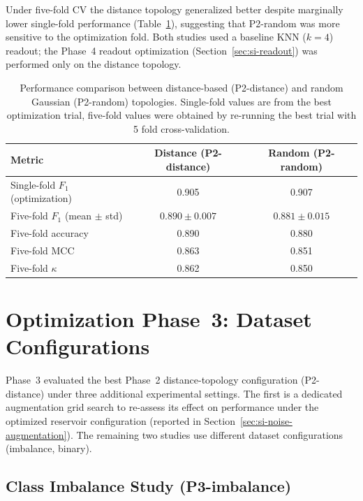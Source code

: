 \documentclass[journal=asbcd6,manuscript=suppinfo]{achemso}
\begin{document}
Under five-fold CV the distance topology generalized better despite marginally lower single-fold performance (Table~\ref{tab:topology-comparison}), suggesting that P2-random was more sensitive to the optimization fold.
Both studies used a baseline KNN ($k=4$) readout; the Phase~4 readout optimization (Section~\ref{sec:si-readout}) was performed only on the distance topology.

\begin{table}[H]
    \centering
    \caption{Performance comparison between distance-based (P2-distance) and random Gaussian (P2-random) topologies. 
    Single-fold values are from the best optimization trial, five-fold values were obtained by re-running the best trial with 5 fold cross-validation.}
    \label{tab:topology-comparison}\small %
    \begin{tabular}{lcc}
        \toprule
        Metric & Distance (P2-distance) & Random (P2-random) \\
        \midrule
        Single-fold $F_1$ (optimization) & 0.905 & 0.907 \\
        Five-fold $F_1$ (mean $\pm$ std) & $0.890 \pm 0.007$ & $0.881 \pm 0.015$ \\
        Five-fold accuracy & 0.890 & 0.880 \\
        Five-fold MCC & 0.863 & 0.851 \\
        Five-fold $\kappa$ & 0.862 & 0.850 \tabularnewline
        \bottomrule

    \end{tabular}
\end{table}

\section{Optimization Phase~3: Dataset Configurations}

Phase~3 evaluated the best Phase~2 distance-topology configuration (P2-distance) under three additional experimental settings.
The first is a dedicated augmentation grid search to re-assess its effect on performance under the optimized reservoir configuration (reported in Section~\ref{sec:si-noise-augmentation}). The remaining two studies use different dataset configurations (imbalance, binary).

\subsection{Class Imbalance Study (P3-imbalance)}
\end{document}

